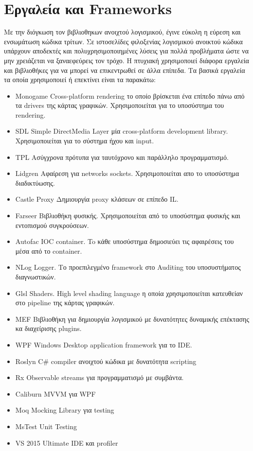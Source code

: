 \section{Εργαλεία και Frameworks}
Με την διόγκωση τον βιβλιοθηκων ανοιχτού λογισμικού, έγινε εύκολη η εύρεση και ενσωμάτωση κώδικα τρίτων. Σε ιστοσελίδες φιλοξενίας λογισμικού ανοικτού κώδικα υπάρχουν αποδεκτές και πολυχρησιμοποιημένες λύσεις για πολλά προβλήματα ώστε να μην χρειάζεται να ξαναεφεύρεις τον τρόχο. Η πτυχιακή χρησιμοποιεί διάφορα εργαλεία και βιβλιοθήκες για να μπορεί να επικεντρωθεί σε άλλα επίπεδα. Τα βασικά εργαλεία τα οποία χρησιμοποιεί ή επεκτίνει είναι τα παρακάτω:
\begin{itemize}
	\item{Monogame} Cross-platform rendering το οποίο βρίσκεται ένα επίπεδο πάνω από τα drivers της κάρτας γραφικών. Χρησιμοποιείται για το υποσύστημα του rendering.
	\item{SDL} Simple DirectMedia Layer μία cross-platform development library. Χρησιμοποιείται για το σύστημα ήχου και input.
	\item{TPL} Ασύγχρονα πρότυπα για ταυτόχρονο και παράλληλο προγραμματισμό.
	\item{Lidgren} Αφαίρεση για networks sockets. Χρησιμοποιείται απο το υποσύστημα διαδικτύωσης.
	\item{Castle Proxy} Δημιουργία proxy κλάσεων σε επίπεδο IL.
	\item{Farseer} Βιβλιοθήκη φυσικής. Χρησιμοποιείται από το υποσύστημα φυσικής και εντοπισμού συγκρούσεων.
	\item{Autofac} IOC container. To κάθε υποσύστημα δημοσιεύει τις αφαιρέσεις του μέσα από το container.
	\item{NLog} Logger. Το προεπιλεγμένο framework στο Auditing του υποσυστήματος διαγνωστικών.
	\item{Glsl} Shaders. High level shading language η οποία χρησιμοποιείται κατευθείαν στο pipeline της κάρτας γραφικών.
	\item{MEF} Βιβλιοθήκη για δημιουργία λογισμικού με δυνατότητες δυναμικής επέκτασης κα διαχείρισης plugins.
	\item{WPF} Windows Desktop application framework για το IDE.
	\item{Roslyn} C\# compiler ανοιχτού κώδικα με δυνατότητα scripting
	\item{Rx} Observable streams για προγραμματισμό με συμβάντα.
	\item{Caliburn} MVVM για WPF
	\item{Moq} Mocking Library για testing
	\item{MsTest} Unit Testing 
	\item{VS 2015 Ultimate} IDE και profiler
\end{itemize}

